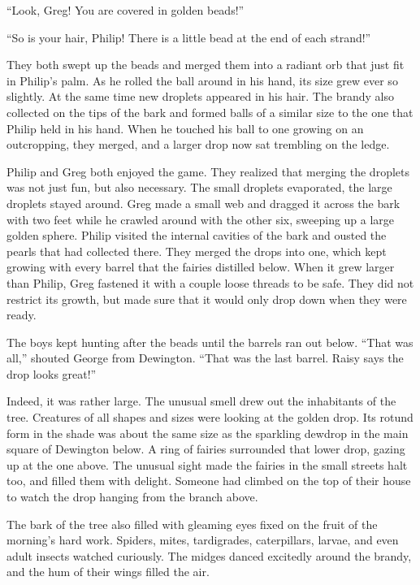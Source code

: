 \documentclass[10pt]{memoir}
\begin{document}
``Look, Greg! You are covered in golden beads!''

``So is your hair, Philip! There is a little bead at the end of each strand!''

They both swept up the beads and merged them into a radiant orb that just fit
in Philip's palm. As he rolled the ball around in his hand, its size grew ever
so slightly. At the same time new droplets appeared in his hair. The brandy
also collected on the tips of the bark and formed balls of a similar size to
the one that Philip held in his hand. When he touched his ball to one growing
on an outcropping, they merged, and a larger drop now sat trembling on the
ledge.

Philip and Greg both enjoyed the game. They realized that merging the droplets
was not just fun, but also necessary. The small droplets evaporated, the large
droplets stayed around. Greg made a small web and dragged it across the bark
with two feet while he crawled around with the other six, sweeping up a large
golden sphere. Philip visited the internal cavities of the bark and ousted the
pearls that had collected there. They merged the drops into one, which kept
growing with every barrel that the fairies distilled below. When it grew
larger than Philip, Greg fastened it with a couple loose threads to be safe.
They did not restrict its growth, but made sure that it would only drop down
when they were ready.

The boys kept hunting after the beads until the barrels ran out below. ``That
was all,'' shouted George from Dewington. ``That was the last barrel. Raisy
says the drop looks great!''

Indeed, it was rather large. The unusual smell drew out the inhabitants of the
tree. Creatures of all shapes and sizes were looking at the golden drop. Its
rotund form in the shade was about the same size as the sparkling dewdrop in
the main square of Dewington below. A ring of fairies surrounded that
lower drop, gazing up at the one above. The unusual sight made the fairies
in the small streets halt too, and filled them with delight. Someone had
climbed on the top of their house to watch the drop hanging from the branch
above.

The bark of the tree also filled with gleaming eyes fixed on the fruit of the
morning's hard work. Spiders, mites, tardigrades, caterpillars, larvae, and
even adult insects watched curiously. The midges danced excitedly around the
brandy, and the hum of their wings filled the air.
\end{document}
